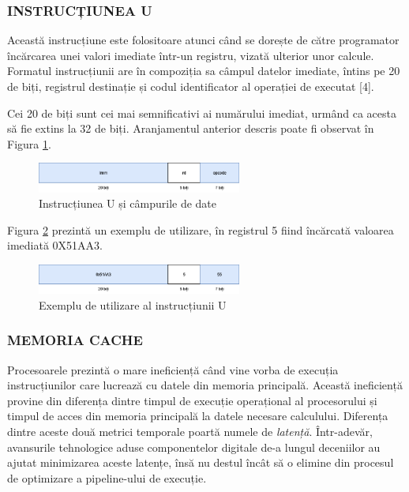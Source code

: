 \documentclass[12pt]{article}
\begin{document}
 \subsubsection{INSTRUCȚIUNEA U}
 Această instrucțiune este folositoare atunci când se dorește de către programator încărcarea unei valori imediate într-un registru, vizată ulterior unor calcule. Formatul instrucțiunii are în compoziția sa câmpul datelor imediate, întins pe 20 de biți, registrul destinație și codul identificator al operației de executat [4].
 
  Cei 20 de biți sunt cei mai semnificativi ai numărului imediat, urmând ca acesta să fie extins la 32 de biți. Aranjamentul anterior descris poate fi observat în Figura \ref{Figura:22}.
 \begin{figure}[h!]
 \includegraphics[width=0.6\textwidth]{utype.png}
 \centering
 \caption{Instrucțiunea U și câmpurile de date}
 \label{Figura:22}
 \end{figure}

Figura \ref{Figura:23} prezintă un exemplu de utilizare, în registrul 5 fiind încărcată valoarea imediată 0X51AA3.

 \begin{figure}[h!]
 \includegraphics[width=0.6\textwidth]{utypeexample.png}
 \centering
 \caption{Exemplu de utilizare al instrucțiunii U}
 \label{Figura:23}
 \end{figure}

\newpage
\subsubsection{MEMORIA CACHE}

Procesoarele prezintă o mare ineficiență când vine vorba de execuția instrucțiunilor care lucrează cu datele din memoria principală. Această ineficiență provine din diferența dintre timpul de execuție operațional al procesorului și timpul de acces din memoria principală la datele necesare calculului. Diferența dintre aceste două metrici temporale poartă numele de \textit{latență}. Într-adevăr, avansurile tehnologice aduse componentelor digitale de-a lungul deceniilor au ajutat minimizarea aceste latențe, însă nu destul încât să o elimine din procesul de optimizare a pipeline-ului de execuție.
\end{document}
